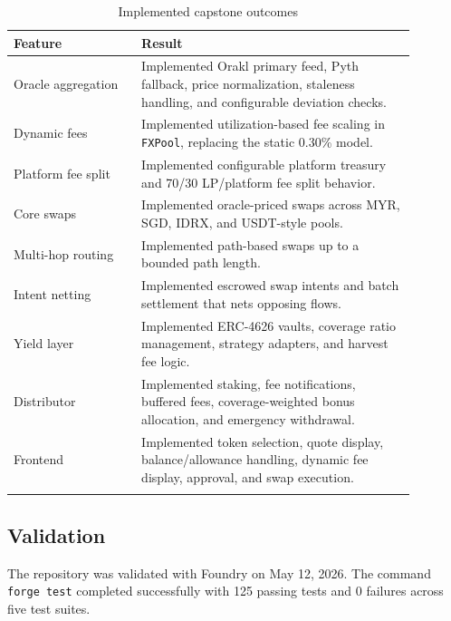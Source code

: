 \documentclass{article}
\begin{document}
\begin{longtable}{p{0.28\linewidth} p{0.60\linewidth}}
\toprule
\textbf{Feature} & \textbf{Result} \\
\midrule
\endhead
Oracle aggregation & Implemented Orakl primary feed, Pyth fallback, price normalization, staleness handling, and configurable deviation checks. \\
Dynamic fees & Implemented utilization-based fee scaling in \texttt{FXPool}, replacing the static 0.30\% model. \\
Platform fee split & Implemented configurable platform treasury and 70/30 LP/platform fee split behavior. \\
Core swaps & Implemented oracle-priced swaps across MYR, SGD, IDRX, and USDT-style pools. \\
Multi-hop routing & Implemented path-based swaps up to a bounded path length. \\
Intent netting & Implemented escrowed swap intents and batch settlement that nets opposing flows. \\
Yield layer & Implemented ERC-4626 vaults, coverage ratio management, strategy adapters, and harvest fee logic. \\
Distributor & Implemented staking, fee notifications, buffered fees, coverage-weighted bonus allocation, and emergency withdrawal. \\
Frontend & Implemented token selection, quote display, balance/allowance handling, dynamic fee display, approval, and swap execution. \\
\bottomrule
\caption{Implemented capstone outcomes}
\end{longtable}

\subsection{Validation}

The repository was validated with Foundry on May 12, 2026. The command \texttt{forge test} completed successfully with 125 passing tests and 0 failures across five test suites.
\end{document}
